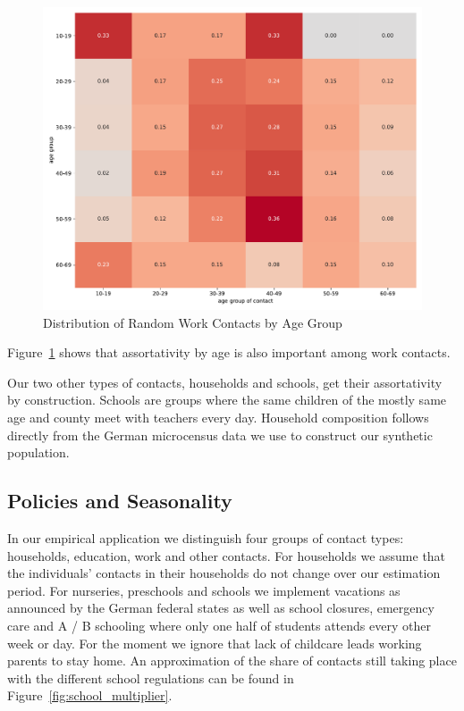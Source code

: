 \begin{figure}[ht]
    \centering
    \includegraphics[width=0.9 \textwidth]{figures/results/figures/data/assortativity_work_non_recurrent}
    \caption{Distribution of Random Work Contacts by Age Group}
    \label{fig:assortativity_work}
\end{figure}

Figure~\ref{fig:assortativity_work} shows that assortativity by age is also important
among work contacts.

Our two other types of contacts, households and schools, get their assortativity by
construction. Schools are groups where the same children of the mostly same age and
county meet with teachers every day. Household composition follows directly from the
German microcensus data we use to construct our synthetic population.

\subsection{Policies and Seasonality}
\label{subsec:policies_seasonality}

\FloatBarrier

In our empirical application we distinguish four groups of contact types: households,
education, work and other contacts.
For households we assume that the individuals'
contacts in their households do not change over our estimation period.
For nurseries, preschools and schools we implement vacations as announced by the German
federal states as well as school closures, emergency care and A / B schooling where only
one half of students attends every other week or day. For the moment we ignore that lack
of childcare leads working parents to stay home. An approximation of the share of contacts still taking place with the different school regulations can be found in Figure~\ref{fig:school_multiplier}.

